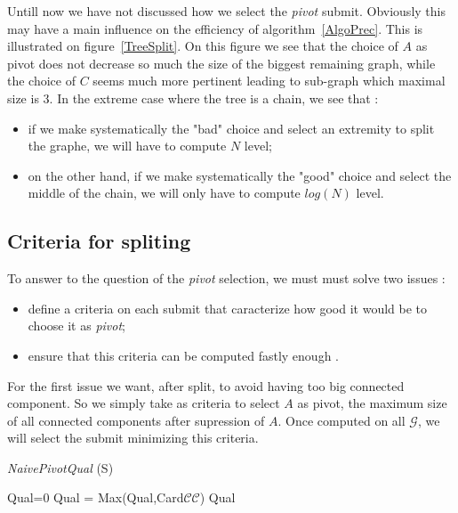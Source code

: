 \documentclass[a4paper]{article}
\begin{document}
Untill now we have not discussed how we select the \emph{pivot} submit.
Obviously this may have a main influence on the efficiency of algorithm~\ref{AlgoPrec}.
This is illustrated on figure~\ref{TreeSplit}. On this figure we see that the
choice of $A$ as pivot does not decrease so much the size of the biggest
remaining graph, while the choice of $C$ seems much more pertinent leading to
sub-graph which maximal size is $3$. In the extreme case where the tree is a chain,
we see that :

\begin{itemize}
    \item if we make systematically the "bad" choice and select an extremity to split
        the graphe, we will have to compute $N$ level;
    \item on the other hand, if we make systematically the "good" choice and select the
        middle of the chain, we will only have to compute $log(N)$ level.
\end{itemize}



\subsection{Criteria for spliting}

To answer to the  question of the \emph{pivot} selection, we must must solve two issues :

\begin{itemize}
   \item define a criteria on each submit that caracterize how good it would be to choose it
       as \emph{pivot};
   \item ensure that this criteria can be computed fastly enough .
\end{itemize}

For the first issue  we want, after split,  to avoid having too big connected
component. So we simply take as criteria to select $A$ as pivot,  the maximum size of all
connected components after supression of $A$. Once computed on all $\mathcal{G}$, we
will select the submit minimizing this criteria.

\begin{algorithm}
\caption{{\it NaivePivotQual} (S)}
\begin{algorithmic}
     \STATE Qual=0  
              \STATE Qual = Max(Qual,Card$\mathcal{CC}$)
     \ENDFOR
     \STATE \RETURN Qual
\end{algorithmic}
\label{AlgoComp}
\end{algorithm}
\end{document}
